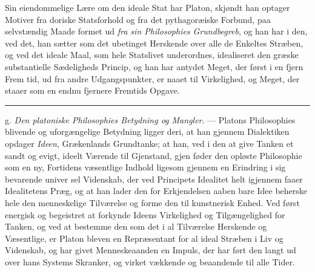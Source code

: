 \documentclass[12pt,a4paper]{book}
\newcommand{\divrule}{\begin{center}\rule{2cm}{0.4pt}\end{center}}
\begin{document}
Sin eiendommelige Lære om den ideale Stat har Platon,
skjøndt han optager Motiver fra doriske Statsforhold og fra
det pythagoræiske Forbund, paa selvstændig Maade formet ud
\emph{fra sin Philosophies Grundbegreb}, og han har i den,
ved det, han sætter som det ubetinget Herskende over alle de
Enkeltes Stræben, og ved det ideale Maal, som hele Statslivet
underordnes, idealiseret den græske substantielle Sædeligheds
Princip, og han har antydet Meget, der først i en fjern Frem\-%
tid, ud fra andre Udgangspunkter, er naaet til Virkelighed, og
Meget, der staaer som en endnu fjernere Fremtids Opgave.

\divrule

g. \emph{Den platoniske Philosophies Betydning og
Mangler}. --- Platons Philosophies blivende og uforgængelige
Betydning ligger deri, at han gjennem Dialektiken opdager
\emph{Ideen}, Grækenlands Grundtanke; at han, ved i den at give
Tanken et sandt og evigt, ideelt Værende til Gjenstand, gjen\-%
føder den opløste Philosophie som en ny, Fortidens væsentlige
Indhold ligesom gjennem en Erindring i sig bevarende univer\-%
sel Videnskab, der ved Principets Idealitet helt igjennem faaer
Idealitetens Præg, og at han lader den for Erkjendelsen aaben\-%
bare Idee beherske hele den menneskelige Tilværelse og forme
den til kunstnerisk Enhed. Ved først energisk og begeistret
at forkynde Ideens Virkelighed og Tilgængelighed for Tanken,
og ved at bestemme den som det i al Tilværelse Herskende
og Væsentlige, er Platon bleven en Repræsentant for al ideal
Stræben i Liv og Videnskab, og har givet Menneskeaanden en
Impuls, der har ført den langt ud over hans Systems
Skranker, og virket vækkende og beaandende til alle Tider.
\end{document}

